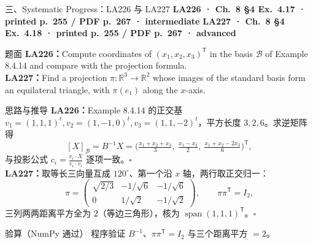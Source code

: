 \documentclass[aspectratio=169,10pt,fontset=none]{ctexbeamer}
\newcommand{\ex}[1]{\textcolor{accent}{\footnotesize\bfseries #1}}
\begin{document}
\begin{frame}[t]{三、Systematic Progress：LA226 与 LA227}
  \leavevmode\ex{LA226 · Ch.~8 §4 Ex.~4.17 · printed p.~255 / PDF p.~267 · intermediate}\quad
  \ex{LA227 · Ch.~8 §4 Ex.~4.18 · printed p.~255 / PDF p.~267 · advanced}
  \begin{block}{\footnotesize 题面}
    \scriptsize \textbf{LA226：}Compute coordinates of $(x_1,x_2,x_3)^{\mathsf T}$ in the basis $\mathcal B$ of Example 8.4.14 and compare with the projection formula.\\
    \textbf{LA227：}Find a projection $\pi:\mathbb R^3\to\mathbb R^2$ whose images of the standard basis form an equilateral triangle, with $\pi(e_1)$ along the $x$-axis.
  \end{block}
  \begin{exampleblock}{\footnotesize 思路与推导}
    \scriptsize
    \textbf{LA226：}Example 8.4.14 的正交基 $v_1=(1,1,1)^t,v_2=(1,-1,0)^t,v_3=(1,1,-2)^t$，平方长度 $3,2,6$。求逆矩阵得
    $$[X]_{\mathcal B}=B^{-1}X=\Big(\tfrac{x_1+x_2+x_3}3,\ \tfrac{x_1-x_2}2,\ \tfrac{x_1+x_2-2x_3}6\Big)^{\mathsf T},$$
    与投影公式 $c_i=\tfrac{v_i\cdot X}{v_i\cdot v_i}$ 逐项一致。$\square$\\[2pt]
    \textbf{LA227：}取等长三向量互成 $120^\circ$、第一个沿 $x$ 轴，两行取正交归一：
    $$\pi=\begin{pmatrix}\sqrt{2/3}&-1/\sqrt6&-1/\sqrt6\\[1pt]0&1/\sqrt2&-1/\sqrt2\end{pmatrix},\qquad \pi\pi^{\mathsf T}=I_2,$$
    三列两两距离平方全为 $2$（等边三角形），核为 $\operatorname{span}(1,1,1)^{\mathsf T}$。$\square$
  \end{exampleblock}
  \begin{block}{\footnotesize 验算（NumPy 通过）}
    \scriptsize 程序验证 $B^{-1}$、$\pi\pi^{\mathsf T}=I_2$ 与三个距离平方 $=2$。
  \end{block}
\end{frame}
\end{document}

